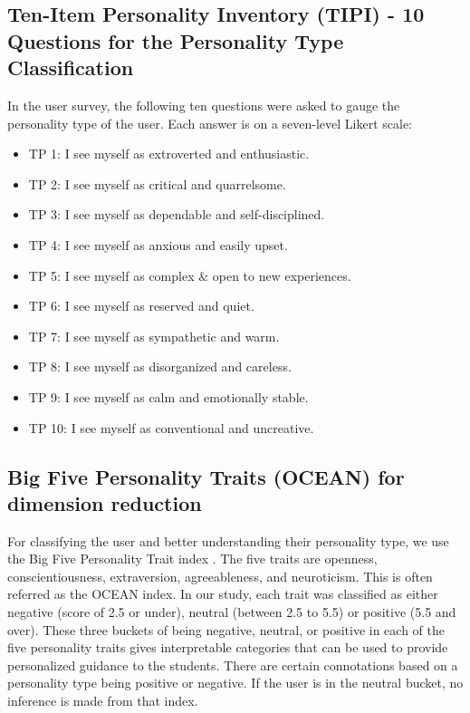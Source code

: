 \documentclass[conference]{IEEEtran}
\begin{document}
\subsection{Ten-Item Personality Inventory (TIPI) - 10 Questions for the Personality Type Classification}\label{subsec2}
In the user survey, the following ten questions \cite{gosling2003very} were asked to gauge the personality type of the user. Each answer is on a seven-level Likert scale:
\begin{itemize}
    \item TP 1: I see myself as extroverted and enthusiastic.
    \item TP 2: I see myself as critical and quarrelsome.
    \item TP 3: I see myself as dependable and self-disciplined.
    \item TP 4: I see myself as anxious and easily upset.
    \item TP 5: I see myself as complex \& open to new experiences.
    \item TP 6: I see myself as reserved and quiet.
    \item TP 7: I see myself as sympathetic and warm.
    \item TP 8: I see myself as disorganized and careless.
    \item TP 9: I see myself as calm and emotionally stable. 
    \item TP 10: I see myself as conventional and uncreative.

\end{itemize}

\subsection{Big Five Personality Traits (OCEAN) for dimension reduction}\label{subsec2}
For classifying the user and better understanding their personality type, we use the Big Five Personality Trait index \cite{john1991big}. The five traits are openness, conscientiousness, extraversion, agreeableness, and neuroticism. This is often referred as the OCEAN index. In our study, each trait was classified as either negative (score of 2.5 or under), neutral (between 2.5 to 5.5) or positive (5.5 and over). These three buckets of being negative, neutral, or positive in each of the five personality traits gives interpretable categories that can be used to
provide personalized guidance to the students.
There are certain connotations based on a
personality type being positive or negative. If
the user is in the neutral bucket, no inference is
made from that index. 
\end{document}
